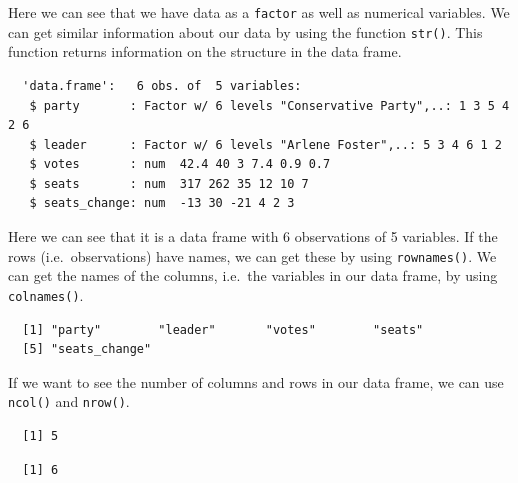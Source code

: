 \documentclass[12pt,oneside]{reedthesis}
\theoremstyle{definition}
\theoremstyle{definition}
\theoremstyle{definition}
\theoremstyle{remark}
\begin{document}
  Here we can see that we have data as a \texttt{factor} as well as
  numerical variables. We can get similar information about our data by
  using the function \texttt{str()}. This function returns information on
  the structure in the data frame.
  \begin{Shaded}
  \begin{Highlighting}[]
  \end{Highlighting}
  \end{Shaded}
  \begin{verbatim}
  'data.frame':   6 obs. of  5 variables:
   $ party       : Factor w/ 6 levels "Conservative Party",..: 1 3 5 4 2 6
   $ leader      : Factor w/ 6 levels "Arlene Foster",..: 5 3 4 6 1 2
   $ votes       : num  42.4 40 3 7.4 0.9 0.7
   $ seats       : num  317 262 35 12 10 7
   $ seats_change: num  -13 30 -21 4 2 3
  \end{verbatim}
  Here we can see that it is a data frame with 6 observations of 5
  variables. If the rows (i.e.~observations) have names, we can get these
  by using \texttt{rownames()}. We can get the names of the columns,
  i.e.~the variables in our data frame, by using \texttt{colnames()}.
  \begin{Shaded}
  \begin{Highlighting}[]
  \end{Highlighting}
  \end{Shaded}
  \begin{verbatim}
  [1] "party"        "leader"       "votes"        "seats"       
  [5] "seats_change"
  \end{verbatim}
  If we want to see the number of columns and rows in our data frame, we
  can use \texttt{ncol()} and \texttt{nrow()}.
  \begin{Shaded}
  \begin{Highlighting}[]
  \end{Highlighting}
  \end{Shaded}
  \begin{verbatim}
  [1] 5
  \end{verbatim}
  \begin{Shaded}
  \begin{Highlighting}[]
  \end{Highlighting}
  \end{Shaded}
  \begin{verbatim}
  [1] 6
  \end{verbatim}
\end{document}
